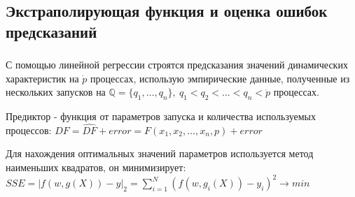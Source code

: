 \documentclass[unicode, t, 11pt]{beamer}%
\begin{document}
		\subsection{Экстраполирующая функция и оценка ошибок предсказаний}
			\begin{frame}
				\frametitle{\insertsection}
					\framesubtitle{\insertsubsection}
					С помощью линейной регрессии строятся предсказания значений динамических характеристик на \(\dot{p}\) процессах, использую эмпирические данные, полученные из нескольких запусков на \(\mathbb{Q} = \{q_1,\ldots, q_n\},\ q_1 < q_2 < \ldots < q_n < \dot{p}\) процессах.

					Предиктор - функция от параметров запуска и количества используемых процессов: \(\label{main_formula}DF = \hat{DF} + error = F(x_1, x_2, \ldots, x_n, p) + error\)

					Для нахождения оптимальных значений параметров используется метод наименьших квадратов, он минимизирует: \(SSE = |f(w, g(X)) - y|_2 = \sum_{i = 1}^{N}{(f(w, g_i(X)) - y_i)^2 \rightarrow min}\)
			\end{frame}
\end{document}
